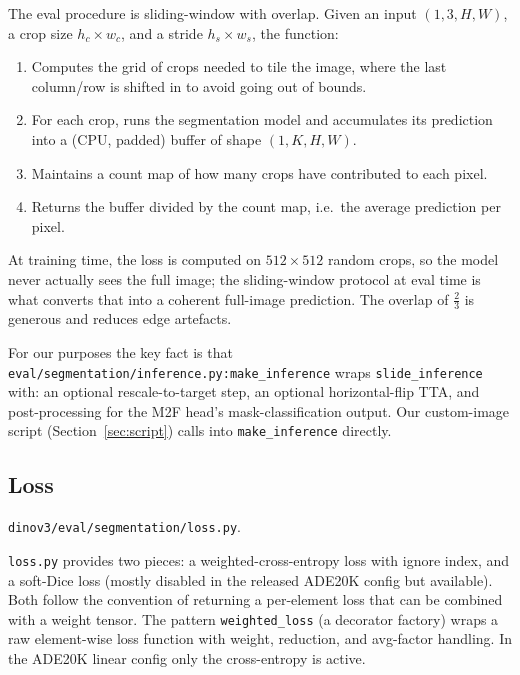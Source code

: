 \documentclass[11pt,a4paper]{article}
\begin{document}
The eval procedure is sliding-window with overlap. Given an input
$(1, 3, H, W)$, a crop size $h_c{\times}w_c$, and a stride $h_s{\times}w_s$,
the function:
\begin{enumerate}[leftmargin=1.6em,itemsep=0pt]
  \item Computes the grid of crops needed to tile the image, where the
        last column/row is shifted in to avoid going out of bounds.
  \item For each crop, runs the segmentation model and accumulates its
        prediction into a (CPU, padded) buffer of shape $(1, K, H, W)$.
  \item Maintains a count map of how many crops have contributed to each
        pixel.
  \item Returns the buffer divided by the count map, i.e.\ the average
        prediction per pixel.
\end{enumerate}
At training time, the loss is computed on $512{\times}512$ random crops, so
the model never actually sees the full image; the sliding-window protocol at
eval time is what converts that into a coherent full-image prediction. The
overlap of $\tfrac{2}{3}$ is generous and reduces edge artefacts.

For our purposes the key fact is that
\texttt{eval/segmentation/inference.py:make\_inference} wraps
\texttt{slide\_inference} with: an optional rescale-to-target step, an
optional horizontal-flip TTA, and post-processing for the M2F head's
mask-classification output. Our custom-image script (Section~\ref{sec:script})
calls into \texttt{make\_inference} directly.

\subsection{Loss}

\begin{srcbox}\texttt{dinov3/eval/segmentation/loss.py}.\end{srcbox}

\texttt{loss.py} provides two pieces: a weighted-cross-entropy loss with
ignore index, and a soft-Dice loss (mostly disabled in the released
ADE20K config but available). Both follow the convention of returning a
per-element loss that can be combined with a weight tensor. The pattern
\texttt{weighted\_loss} (a decorator factory) wraps a raw element-wise
loss function with weight, reduction, and avg-factor handling. In the
ADE20K linear config only the cross-entropy is active.
\end{document}
